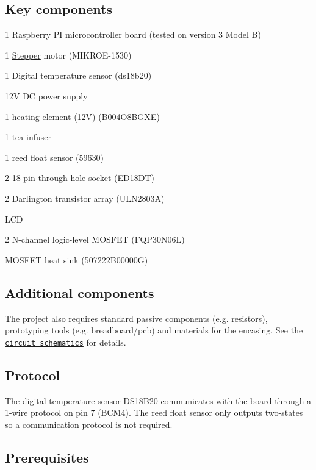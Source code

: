 \subsection*{Key components}


\begin{DoxyItemize}
\item 1 Raspberry PI microcontroller board (tested on version 3 Model B)
\item 1 \mbox{\hyperlink{classStepper}{Stepper}} motor (M\+I\+K\+R\+O\+E-\/1530)
\item 1 Digital temperature sensor (ds18b20)
\item 12V DC power supply
\item 1 heating element (12V) (B004\+O8\+B\+G\+XE)
\item 1 tea infuser
\item 1 reed float sensor (59630)
\item 2 18-\/pin through hole socket (E\+D18\+DT)
\item 2 Darlington transistor array (U\+L\+N2803A)
\item L\+CD
\item 2 N-\/channel logic-\/level M\+O\+S\+F\+ET (F\+Q\+P30\+N06L)
\item M\+O\+S\+F\+ET heat sink (507222\+B00000G)
\end{DoxyItemize}

\subsection*{Additional components}

The project also requires standard passive components (e.\+g. resistors), prototyping tools (e.\+g. breadboard/pcb) and materials for the encasing. See the \href{Main.sch}{\tt circuit schematics} for details.

\subsection*{Protocol}

The digital temperature sensor \mbox{\hyperlink{classDS18B20}{D\+S18\+B20}} communicates with the board through a 1-\/wire protocol on pin 7 (B\+C\+M4). The reed float sensor only outputs two-\/states so a communication protocol is not required.

\subsection*{Prerequisites}

